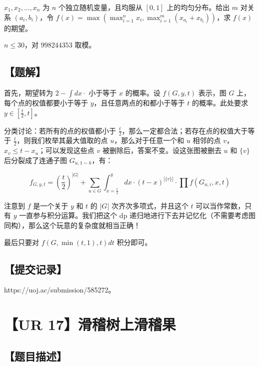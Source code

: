 \documentclass[UTF8,12pt,a4paper]{ctexart}
\begin{document}
	$x_1,x_2,...,x_n$ 为 $n$ 个独立随机变量，且均服从 $[0,1]$ 上的均匀分布。给出 $m$ 对关系 $(a_i,b_i)$，令 $f(x)=\max\left(\max_{i=1}^n x_i,\max^m_{i=1}\left(x_{a_i}+x_{b_i}\right)\right)$，求 $f(x)$ 的期望。
	
	$n\le 30$，对 $998244353$ 取模。
	
	\subsection*{【题解】}
	
	首先，期望转为 $2-\int dx \cdot $ 小于等于 $x$ 的概率。设 $f(G,y,t)$ 表示，图 $G$ 上，每个点的权值都要小于等于 $y$，且任意两点的和都小于等于 $t$ 的概率。此处要求 $y\in[\frac t2,t]$。
	
	分类讨论：若所有的点的权值都小于 $\frac t2$，那么一定都合法；若存在点的权值大于等于 $\frac t2$，则我们枚举其最大值取的点 $u$，那么对于任意一个和 $u$ 相邻的点 $v$，$x_v\le t-x_u$；可以发现这些点 $v$ 被删除后，答案不变。设这张图被删去 $u$ 和 $\{v\}$ 后分裂成了连通子图 $G_{u,1\sim k}$，有：
	
	$$
	f_{G,y,t}=\left(\frac t2\right)^{|G|}+\sum_{u\in G}{\int_{x=\frac t2}^y dx\cdot (t-x)^{|\{v\}|}\cdot\prod f\left(G_{u,i},x,t\right)}
	$$
	
	注意到 $f$ 是一个关于 $y$ 和 $t$ 的 $|G|$ 次齐次多项式，并且这个 $t$ 可以当作常数，只有 $y$ 一直参与积分运算。我们把这个 dp 递归地进行下去并记忆化（不需要考虑图同构），那么这个玩意的复杂度就相当正确！
	
	最后只要对 $f(G,\min(t,1),t)dt$ 积分即可。
	
	\subsection*{【提交记录】}
	
	https://uoj.ac/submission/585272。
	
	
	\section*{【UR 17】滑稽树上滑稽果}
	
	\subsection*{【题目描述】}
	
\end{document}
